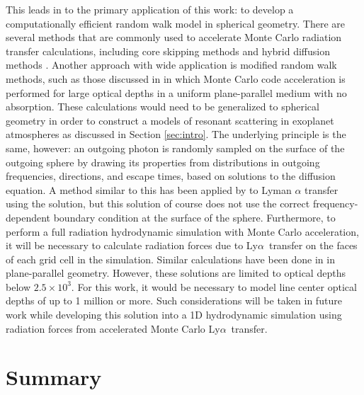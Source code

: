 \documentclass{aastex63}
\newcommand\lya{Ly$\alpha$\ }
\begin{document}
This leads in to the primary application of this work: to develop a computationally efficient random walk model in spherical geometry. There are several methods that are commonly used to accelerate Monte Carlo radiation transfer calculations, including core skipping methods \citep{1968ApJ...153..783A,2002ApJ...567..922A} and hybrid diffusion methods \citep{2018MNRAS.479.2065S}. Another approach with wide application is modified random walk methods, such as those discussed in \citet{2002ApJ...567..922A,2015MNRAS.449.4336S} in which Monte Carlo code acceleration is performed for large optical depths in a uniform plane-parallel medium with no absorption. These calculations would need to be generalized to spherical geometry in order to construct a models of resonant scattering in exoplanet atmospheres as discussed in Section \ref{sec:intro}. The underlying principle is the same, however: an outgoing photon is randomly sampled on the surface of the outgoing sphere by drawing its properties from distributions in outgoing frequencies, directions, and escape times, based on solutions to the diffusion equation. A method similar to this has been applied by \citet{2006ApJ...645..792T} to Lyman $\alpha$ transfer using the \cite{1990ApJ...350..216N} solution, but this solution of course does not use the correct frequency-dependent boundary condition at the surface of the sphere. Furthermore, to perform a full radiation hydrodynamic simulation with Monte Carlo acceleration, it will be necessary to calculate radiation forces due to \lya transfer on the faces of each grid cell in the simulation. Similar calculations have been done in \citet{1976ApJ...208..286W} in plane-parallel geometry. However, these solutions are limited to optical depths below $2.5 \times 10^3$. For this work, it would be necessary to model line center optical depths of up to 1 million or more. Such considerations will be taken in future work while developing this solution into a 1D hydrodynamic simulation using radiation forces from accelerated Monte Carlo \lya transfer.

\section{Summary}
\end{document}
